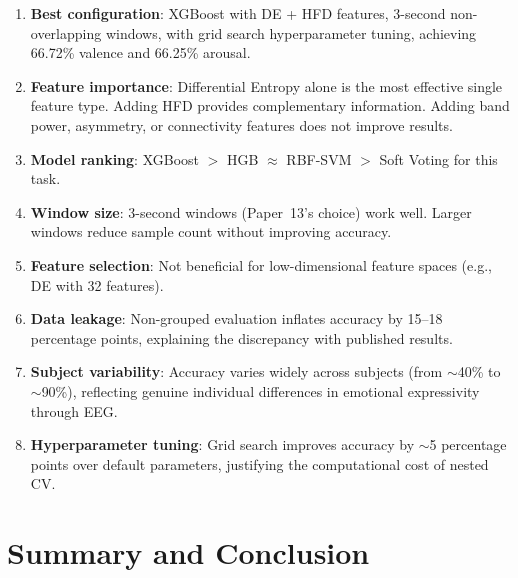 \documentclass[12pt,a4paper]{report}
\begin{document}
\begin{enumerate}
    \item \textbf{Best configuration}: XGBoost with DE + HFD features,
          3-second non-overlapping windows, with grid search hyperparameter
          tuning, achieving 66.72\% valence and 66.25\% arousal.

    \item \textbf{Feature importance}: Differential Entropy alone is the most
          effective single feature type. Adding HFD provides complementary
          information. Adding band power, asymmetry, or connectivity features
          does not improve results.

    \item \textbf{Model ranking}: XGBoost $>$ HGB $\approx$ RBF-SVM $>$
          Soft Voting for this task.

    \item \textbf{Window size}: 3-second windows (Paper~13's choice) work well.
          Larger windows reduce sample count without improving accuracy.

    \item \textbf{Feature selection}: Not beneficial for low-dimensional
          feature spaces (e.g., DE with 32 features).

    \item \textbf{Data leakage}: Non-grouped evaluation inflates accuracy by
          15--18 percentage points, explaining the discrepancy with published
          results.

    \item \textbf{Subject variability}: Accuracy varies widely across subjects
          (from $\sim$40\% to $\sim$90\%), reflecting genuine individual
          differences in emotional expressivity through EEG.

    \item \textbf{Hyperparameter tuning}: Grid search improves accuracy by
          $\sim$5 percentage points over default parameters, justifying the
          computational cost of nested CV.
\end{enumerate}


\chapter{Summary and Conclusion}
\label{ch:conclusion}
\end{document}

